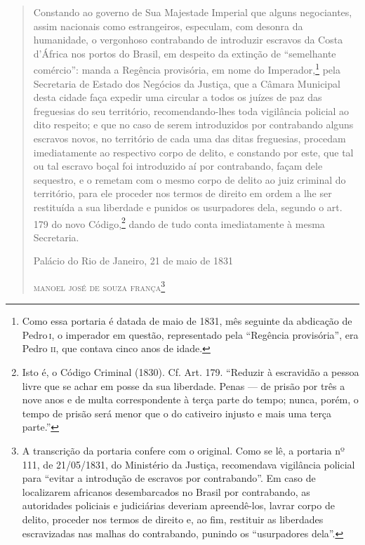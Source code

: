 \begin{quote}
Constando ao governo de Sua Majestade Imperial que alguns negociantes,
assim nacionais como estrangeiros, especulam, com desonra da humanidade,
o vergonhoso contrabando de introduzir escravos da Costa d'África nos
portos do Brasil, em despeito da extinção de ``semelhante comércio'':
manda a Regência provisória, em nome do Imperador,\footnote{Como essa
  portaria é datada de maio de 1831, mês seguinte da abdicação de Pedro\,\textsc{i}, o imperador em questão, representado pela ``Regência provisória'', era
  Pedro \textsc{ii}, que contava cinco anos de idade.} pela Secretaria de
Estado dos Negócios da Justiça, que a Câmara Municipal desta cidade faça
expedir uma circular a todos os juízes de paz das freguesias do seu
território, recomendando-lhes toda vigilância policial ao dito respeito;
e que no caso de serem introduzidos por contrabando alguns escravos
novos, no território de cada uma das ditas freguesias, procedam
imediatamente ao respectivo corpo de delito, e constando por este, que
tal ou tal escravo boçal foi introduzido aí por contrabando, façam dele
sequestro, e o remetam com o mesmo corpo de delito ao juiz criminal do
território, para ele proceder nos termos de direito em ordem a lhe ser
restituída a sua liberdade e punidos os usurpadores dela, segundo o art.
179 do novo Código,\footnote{Isto é, o Código Criminal (1830). Cf. Art.
  179. ``Reduzir à escravidão a pessoa livre que se achar em posse da sua
  liberdade. Penas --- de prisão por três a nove anos e de multa
  correspondente à terça parte do tempo; nunca, porém, o tempo de prisão
  será menor que o do cativeiro injusto e mais uma terça parte.''} dando
de tudo conta imediatamente à mesma Secretaria.

\medskip

\hfill{} Palácio do Rio de Janeiro, 21 de maio de 1831

\hfill\textsc{manoel josé de souza frança}\footnote{A transcrição da portaria
  confere com o original. Como se lê, a portaria nº 111, de 21/05/1831,
  do Ministério da Justiça, recomendava vigilância policial para ``evitar
  a introdução de escravos por contrabando''. Em caso de localizarem
  africanos desembarcados no Brasil por contrabando, as autoridades
  policiais e judiciárias deveriam apreendê-los, lavrar corpo de
  delito, proceder nos termos de direito e, ao fim, restituir as
  liberdades escravizadas nas malhas do contrabando, punindo os
  ``usurpadores dela''.}
\end{quote}

